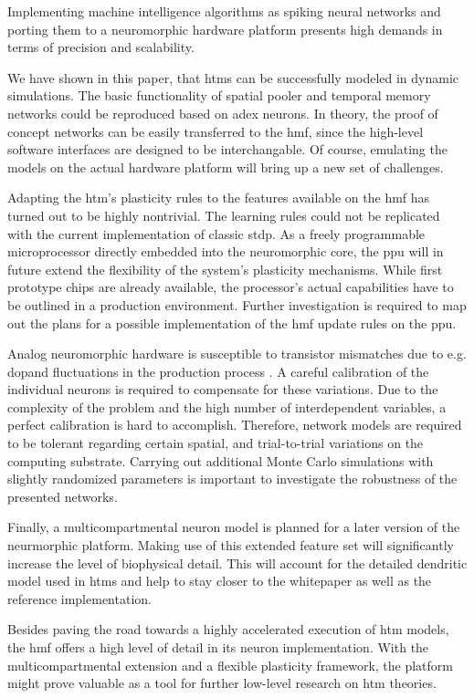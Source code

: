 Implementing machine intelligence algorithms as spiking neural networks and porting them to a neuromorphic hardware platform presents high demands in terms of precision and scalability.

We have shown in this paper, that \glspl{htm} can be successfully modeled in dynamic simulations. The basic functionality of spatial pooler and temporal memory networks could be reproduced based on \gls{adex} neurons. In theory, the proof of concept networks can be easily transferred to the \gls{hmf}, since the high-level software interfaces are designed to be interchangable. Of course, emulating the models on the actual hardware platform will bring up a new set of challenges.

Adapting the \gls{htm}'s plasticity rules to the features available on the \gls{hmf} has turned out to be highly nontrivial. The learning rules could not be replicated with the current implementation of classic \gls{stdp}. As a freely programmable microprocessor directly embedded into the neuromorphic core, the \gls{ppu} will in future extend the flexibility of the system's plasticity mechanisms. While first prototype chips are already available, the processor's actual capabilities have to be outlined in a production environment. Further investigation is required to map out the plans for a possible implementation of the \gls{hmf} update rules on the \gls{ppu}.

Analog neuromorphic hardware is susceptible to transistor mismatches due to e.g. dopand fluctuations in the production process \citep{petrovici2014characterization}. A careful calibration of the individual neurons is required to compensate for these variations. Due to the complexity of the problem and the high number of interdependent variables, a perfect calibration is hard to accomplish. Therefore, network models are required to be tolerant regarding certain spatial, and trial-to-trial variations on the computing substrate. Carrying out additional Monte Carlo simulations with slightly randomized parameters is important to investigate the robustness of the presented networks.

Finally, a multicompartmental neuron model is planned for a later version of the neurmorphic platform. Making use of this extended feature set will significantly increase the level of biophysical detail. This will account for the detailed dendritic model used in \glspl{htm} and help to stay closer to the whitepaper as well as the reference implementation.

Besides paving the road towards a highly accelerated execution of \gls{htm} models, the \gls{hmf} offers a high level of detail in its neuron implementation. With the multicompartmental extension and a flexible plasticity framework, the platform might prove valuable as a tool for further low-level research on \gls{htm} theories.
